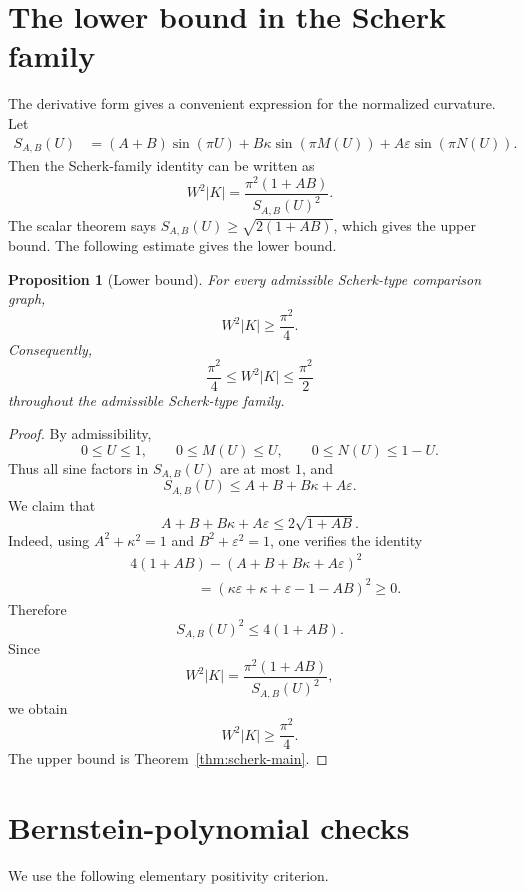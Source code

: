\documentclass[11pt]{amsart}
\newtheorem{proposition}[theorem]{Proposition}
\theoremstyle{remark}
\newcommand{\eps}{\varepsilon}
\numberwithin{equation}{section}
\begin{document}
\section{The lower bound in the Scherk family}\label{app:lower}

The derivative form gives a convenient expression for the normalized curvature. Let
\[
\begin{aligned}
        S_{A,B}(U)
        &=(A+B)\sin(\pi U)
        +B\kappa\sin(\pi M(U))
        +A\eps\sin(\pi N(U)).
\end{aligned}
\]
Then the Scherk-family identity can be written as
\[
        W^2|K|=\frac{\pi^2(1+AB)}{S_{A,B}(U)^2}.
\]
The scalar theorem says $S_{A,B}(U)\geq \sqrt{2(1+AB)}$, which gives the upper bound. The following estimate gives the lower bound.

\begin{proposition}[Lower bound]\label{prop:lower}
For every admissible Scherk-type comparison graph,
\[
        W^2|K|\geq \frac{\pi^2}{4}.
\]
Consequently,
\[
        \frac{\pi^2}{4}\leq W^2|K|\leq \frac{\pi^2}{2}
\]
throughout the admissible Scherk-type family.
\end{proposition}

\begin{proof}
By admissibility,
\[
        0\leq U\leq 1,
        \qquad
        0\leq M(U)\leq U,
        \qquad
        0\leq N(U)\leq 1-U.
\]
Thus all sine factors in $S_{A,B}(U)$ are at most $1$, and
\[
        S_{A,B}(U)\leq A+B+B\kappa+A\eps.
\]
We claim that
\[
        A+B+B\kappa+A\eps\leq 2\sqrt{1+AB}.
\]
Indeed, using $A^2+
        \kappa^2=1$ and $B^2+
        \eps^2=1$, one verifies the identity
\[
\begin{aligned}
&4(1+AB)-(A+B+B\kappa+A\eps)^2       \\
&\hspace{2cm}=(\kappa\eps+
        \kappa+
        \eps-1-AB)^2\geq 0.
\end{aligned}
\]
Therefore
\[
        S_{A,B}(U)^2\leq 4(1+AB).
\]
Since
\[
        W^2|K|=\frac{\pi^2(1+AB)}{S_{A,B}(U)^2},
\]
we obtain
\[
        W^2|K|\geq \frac{\pi^2}{4}.
\]
The upper bound is Theorem~\ref{thm:scherk-main}.
\end{proof}

\section{Bernstein-polynomial checks}\label{app:bernstein}

We use the following elementary positivity criterion.
\end{document}
